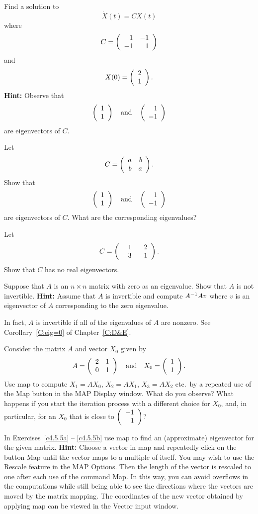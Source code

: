 \begin{exercise} \label{c4.5.2}
Find a solution to
\[
\dot{X}(t)=CX(t)
\]
where
\[
C=\left(\begin{array}{rr} 1 & -1\\ -1 &1\end{array}\right)
\]
and
\[
X(0)=\left(\begin{array}{r} 2 \\ 1\end{array}\right).
\]
{\bf Hint:} Observe that
\[
\left(\begin{array}{r} 1 \\ 1\end{array}\right) \quad\mbox{and}\quad \left(\begin{array}{r} 1 \\ -1\end{array}\right)
\]
are eigenvectors of $C$.
\end{exercise}

\begin{exercise} \label{c4.5.3}
Let
\[
C=\left(\begin{array}{rr} a & b\\ b &a\end{array}\right).
\]
Show that
\[
\left(\begin{array}{r} 1 \\ 1\end{array}\right) \quad\mbox{and}\quad \left(\begin{array}{r} 1 \\ -1\end{array}\right)
\]
are eigenvectors of $C$.  What are the corresponding eigenvalues?
\end{exercise}

\begin{exercise} \label{c4.5.4}
Let
\[
C=\left(\begin{array}{rr} 1 & 2\\ -3 &-1\end{array}\right).
\]
Show that $C$ has no real eigenvectors.
\end{exercise}

\begin{exercise}  \label{c4.9.6A}
Suppose that $A$ is an $n\times n$ matrix with zero as an eigenvalue.
Show that $A$ is not invertible.  {\bf Hint:}  Assume that $A$ is invertible 
and compute $A^{-1} Av$ where $v$ is an eigenvector of $A$ corresponding to 
the zero eigenvalue.
\end{exercise}
  In fact, $A$ is invertible if 
all of the eigenvalues of $A$ are nonzero.  See Corollary~\ref{C:eig=0} of 
Chapter~\ref{C:D&E}.


\CEXER

\begin{exercise} \label{c4.5.6}
Consider the matrix $A$ and vector $X_0$ given by
\[
A=\left(\begin{array}{rr} 2 & 1\\ 0 &1\end{array}\right)\quad\mbox{and}\quad X_0=\left(\begin{array}{r} 1 \\ 1\end{array}\right).
\]
Use {\sf map} to compute $X_1 = AX_0$, $X_2 = AX_1$, $X_3=AX_2$ etc.\ by a
repeated use of the {\sf Map} button in the {\sf MAP Display} window.  What
do you observe?  What happens if you start the iteration process with a
different choice for $X_0$, and, in particular, for an $X_0$ that is close
to $\left(\begin{array}{r} -1 \\ 1\end{array}\right)$?
\end{exercise}

\noindent In Exercises~\ref{c4.5.5a} -- \ref{c4.5.5b} use {\sf map} to find
an (approximate) eigenvector for the given matrix.  {\bf Hint:} Choose a
vector in {\sf map} and repeatedly click on the button {\sf Map} until the
vector maps to a multiple of itself.  You may wish to use the {\sf Rescale} 
feature in the {\sf MAP Options}.  Then the length of the vector is rescaled 
to one after each use of the command {\sf Map}. In this way, you can avoid
overflows in the computations while still being able to see the
directions where the vectors are moved by the matrix mapping.  The coordinates 
of the new vector obtained by applying {\sf map} can be viewed in the 
{\sf Vector input} window.

